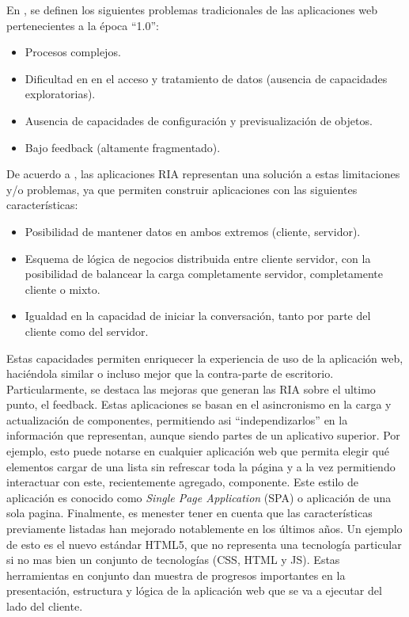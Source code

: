 En \citet{Duhl2003}, se definen los siguientes problemas tradicionales de las aplicaciones web pertenecientes a la época ``1.0'':
\begin{itemize}
\item Procesos complejos.
\item Dificultad en en el acceso y tratamiento de datos (ausencia de capacidades exploratorias).
\item Ausencia de capacidades de configuración y previsualización de objetos.
\item Bajo feedback (altamente fragmentado).
\end{itemize}
De acuerdo a  \citet{Fraternali2010}, las aplicaciones RIA representan una solución a estas limitaciones y/o problemas, ya que permiten construir aplicaciones con las siguientes características:
\begin{itemize}
\item Posibilidad de mantener datos en ambos extremos (cliente, servidor).
\item Esquema de lógica de negocios distribuida entre cliente servidor, con la posibilidad de balancear la carga completamente servidor, completamente cliente o mixto.
\item Igualdad en la capacidad de iniciar la conversación, tanto por parte del cliente como del servidor.
\end{itemize}
Estas capacidades permiten enriquecer la experiencia de uso de la aplicación web, haciéndola similar o incluso mejor que la contra-parte de escritorio. Particularmente, se destaca las mejoras que generan las RIA sobre el ultimo punto, el feedback. Estas aplicaciones se basan en el asincronismo en la carga y actualización de componentes, permitiendo asi ``independizarlos'' en la información que representan, aunque siendo partes de un aplicativo superior. Por ejemplo, esto puede notarse en cualquier aplicación web que permita elegir qué elementos cargar de una lista sin refrescar toda la página y a la vez permitiendo interactuar con este, recientemente agregado, componente. Este estilo de aplicación es conocido como \emph{Single Page Application} (SPA) o aplicación de una sola pagina.
Finalmente, es menester tener en cuenta que las características previamente listadas han mejorado notablemente en los últimos años. Un ejemplo de esto es el nuevo estándar HTML5, que no representa una tecnología particular si no mas bien un conjunto de tecnologías (CSS, HTML y JS). Estas herramientas en conjunto dan muestra de progresos importantes en la presentación, estructura y lógica de la aplicación web que se va a ejecutar del lado del cliente.

